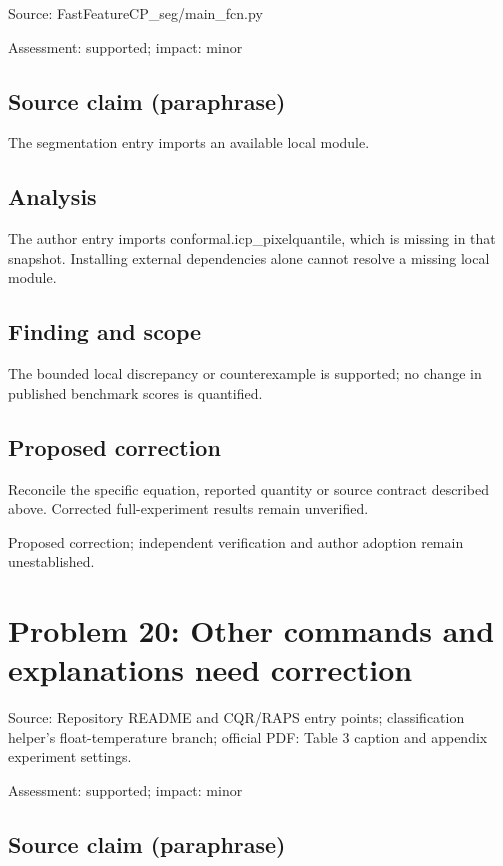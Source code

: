 \documentclass[11pt]{article}
\begin{document}
Source: FastFeatureCP\_seg/main\_fcn.py

Assessment: supported; impact: minor

\subsection*{Source claim (paraphrase)}

The segmentation entry imports an available local module.

\subsection*{Analysis}

The author entry imports conformal.icp\_pixelquantile, which is missing in that snapshot. Installing external dependencies alone cannot resolve a missing local module.

\subsection*{Finding and scope}

The bounded local discrepancy or counterexample is supported; no change in published benchmark scores is quantified.

\subsection*{Proposed correction}

Reconcile the specific equation, reported quantity or source contract described above. Corrected full-experiment results remain unverified.

Proposed correction; independent verification and author adoption remain unestablished.

\section*{Problem 20: Other commands and explanations need correction}

Source: Repository README and CQR/RAPS entry points; classification helper's float-temperature branch; official PDF: Table 3 caption and appendix experiment settings.

Assessment: supported; impact: minor

\subsection*{Source claim (paraphrase)}
\end{document}
